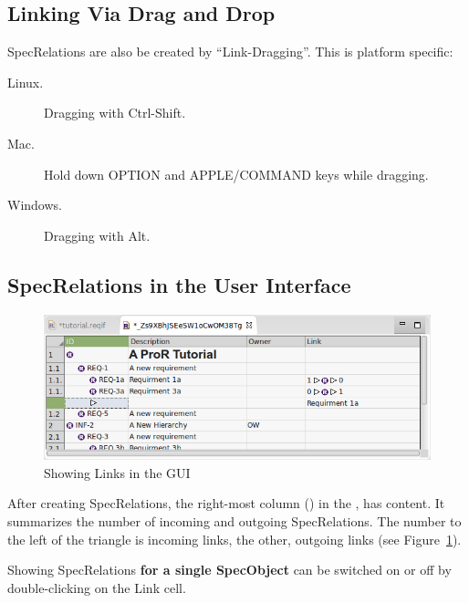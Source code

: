 \subsection{Linking Via Drag and Drop}
\label{sec:drag-links}

SpecRelations are also be created by ``Link-Dragging''.  This is platform specific:

\begin{description}

\item
  [Linux.] Dragging with Ctrl-Shift.
\item
  [Mac.] Hold down OPTION and APPLE/COMMAND keys while dragging.
\item
  [Windows.] Dragging with Alt.
\end{description}

\subsection{SpecRelations in the User Interface}
\label{sec:links-ui}

\begin{figure}   
\centering      
\includegraphics[width=0.8\linewidth]{../rmf-images/links.png}      
\caption{Showing Links in the GUI}      
\label{fig:linksInGui}
\end{figure}

After creating SpecRelations, the right-most column () in the , has content.  It summarizes the number of incoming and outgoing SpecRelations.  The number to the left of the triangle is incoming links, the other, outgoing links (see Figure~\ref{fig:linksInGui}).

Showing SpecRelations \textbf{for a single SpecObject} can be switched on or off by double-clicking on the Link cell.

